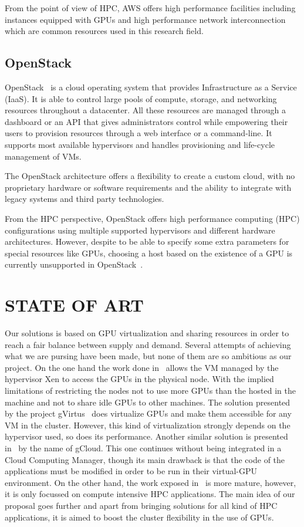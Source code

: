 \documentclass[a4paper,twoside]{article}
\begin{document}
From the point of view of HPC, AWS offers high performance facilities including 
instances equipped with GPUs and high performance network interconnection which 
are common resources used in this research field.

\subsection{OpenStack}
\label{sec:openstack}

OpenStack~\cite{OpenStack} is a cloud operating system that provides Infrastructure as a Service (IaaS). 
It is able to control large pools of compute, storage, and networking resources throughout a 
datacenter. All these resources are managed through a dashboard or an API that gives administrators 
control while empowering their users to provision resources through a web interface
or a command-line. 
It supports most available hypervisors and handles provisioning 
and life-cycle management of VMs.
 
The OpenStack architecture offers a flexibility to create a custom cloud, with no proprietary hardware
or software requirements and the ability to integrate with legacy systems and third party technologies. 

From the HPC perspective, OpenStack offers high performance computing (HPC) configurations using
multiple supported hypervisors and different hardware architectures. However, despite to be able to
specify some extra parameters for special resources like GPUs, choosing a host based on the existence
of a GPU is currently unsupported in OpenStack~\cite{OpenStackGPU}. 

\section{\uppercase{State of Art}}
\label{sec:state}
Our solutions
is based on GPU virtualization and sharing resources in order
to reach a fair balance between supply and demand.
Several attempts of achieving what we are pursing have been
made, but none of them are so ambitious as our project. On
the one hand the work done in~\cite{younge2013enabling} allows the VM managed
by the hypervisor Xen to access the GPUs in the physical
node. With the implied limitations of restricting the nodes not
to use more GPUs than the hosted in the machine and not
to share idle GPUs to other machines. The solution presented
by the project gVirtus~\cite{giunta2010gpgpu} does virtualize GPUs and make
them accessible for any VM in the cluster. However, this kind
of virtualization strongly depends on the hypervisor used, so
does its performance. Another similar solution is presented in~\cite{diab2013dynamic} by the name of gCloud. This one continues without being
integrated in a Cloud Computing Manager, though its main
drawback is that the code of the applications must be modified
in order to be run in their virtual-GPU environment. On the
other hand, the work exposed in~\cite{jungpgpu} is more mature, however,
it is only focussed on compute intensive HPC applications.
The main idea of our proposal goes further and apart from
bringing solutions for all kind of HPC applications, it is aimed
to boost the cluster flexibility in the use of GPUs.
\end{document}
